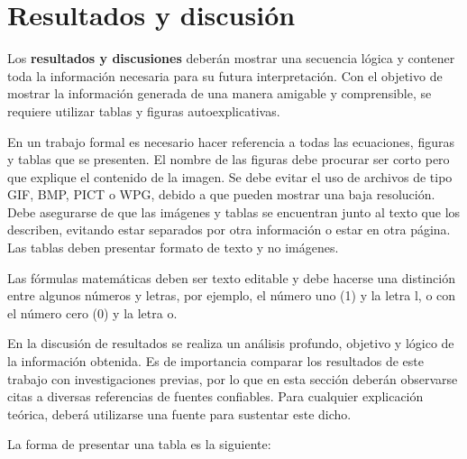 \documentclass[11pt,letterpaper,twocolumn]{article}
\begin{document}
\section{Resultados y discusión}
\justify
Los \textbf{resultados y discusiones} deberán mostrar una secuencia lógica y contener toda la información necesaria para su futura interpretación. Con el objetivo de mostrar la información generada de una manera amigable y comprensible, se requiere utilizar tablas y figuras autoexplicativas.\par \vspace{5mm}
En un trabajo formal es necesario hacer referencia a todas las ecuaciones, figuras y tablas que se presenten. El nombre de las figuras debe procurar ser corto pero que explique el contenido de la imagen. Se debe evitar el uso de archivos de tipo GIF, BMP, PICT o WPG, debido a que pueden mostrar una baja resolución. Debe asegurarse de que las imágenes y tablas se encuentran junto al texto que los describen, evitando estar separados por otra información o estar en otra página. Las tablas deben presentar formato de texto y no imágenes. \par \vspace{5mm}
Las fórmulas matemáticas deben ser texto editable y debe hacerse una distinción entre algunos números y letras, por ejemplo, el número uno (1) y la letra l, o con el número cero (0) y la letra o.\par \vspace{5mm}
En la discusión de resultados se realiza un análisis profundo, objetivo y lógico de la información obtenida. Es de importancia comparar los resultados de este trabajo con investigaciones previas, por lo que en esta sección deberán observarse citas a diversas referencias de fuentes confiables. Para cualquier explicación teórica, deberá utilizarse una fuente para sustentar este dicho.\par \vspace{5mm}
La forma de presentar una tabla es la siguiente:
\end{document}
